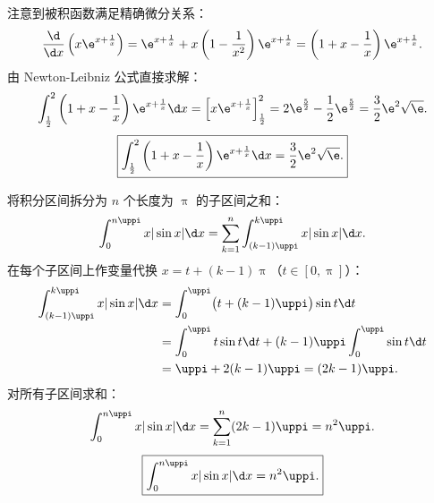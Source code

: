 \begin{solution}

    注意到被积函数满足精确微分关系：
    \begin{equation}
        \frac{\d}{\d x}\left( x \e^{x + \frac{1}{x}} \right) = \e^{x + \frac{1}{x}} + x\left(1 - \frac{1}{x^2}\right)\e^{x + \frac{1}{x}} = \left(1 + x - \frac{1}{x}\right)\e^{x + \frac{1}{x}}.
    \end{equation}
    由 Newton-Leibniz 公式直接求解：
    \begin{equation}
        \int_{\frac{1}{2}}^2 \left(1 + x - \frac{1}{x}\right) \e^{x + \frac{1}{x}} \d x = \left[ x \e^{x + \frac{1}{x}} \right]_{\frac{1}{2}}^2 = 2\e^{\frac{5}{2}} - \frac{1}{2}\e^{\frac{5}{2}} = \frac{3}{2}\e^2\sqrt{\e}.
    \end{equation}
    \begin{equation}
        \boxed{\int_{\frac{1}{2}}^2 \left(1 + x - \frac{1}{x}\right) \e^{x + \frac{1}{x}} \d x = \frac{3}{2}\e^2\sqrt{\e}.}
    \end{equation}


    将积分区间拆分为 $n$ 个长度为 $\uppi$ 的子区间之和：
    \begin{equation}
        \int_0^{n\uppi} x |\sin x| \d x = \sum_{k=1}^n \int_{(k-1)\uppi}^{k\uppi} x |\sin x| \d x.
    \end{equation}
    在每个子区间上作变量代换 $x = t + (k-1)\uppi$（$t \in [0, \uppi]$）：
    \begin{equation}
        \begin{aligned}
            \int_{(k-1)\uppi}^{k\uppi} x |\sin x| \d x & = \int_0^{\uppi} \bigl(t + (k-1)\uppi\bigr)\sin t \d t                 \\
                                                       & = \int_0^{\uppi} t \sin t \d t + (k-1)\uppi \int_0^{\uppi} \sin t \d t \\
                                                       & = \uppi + 2(k-1)\uppi = (2k - 1)\uppi.
        \end{aligned}
    \end{equation}
    对所有子区间求和：
    \begin{equation}
        \int_0^{n\uppi} x |\sin x| \d x = \sum_{k=1}^n (2k - 1)\uppi = n^2 \uppi.
    \end{equation}
    \begin{equation}
        \boxed{\int_0^{n\uppi} x |\sin x| \d x = n^2 \uppi.}
    \end{equation}


\end{solution}
